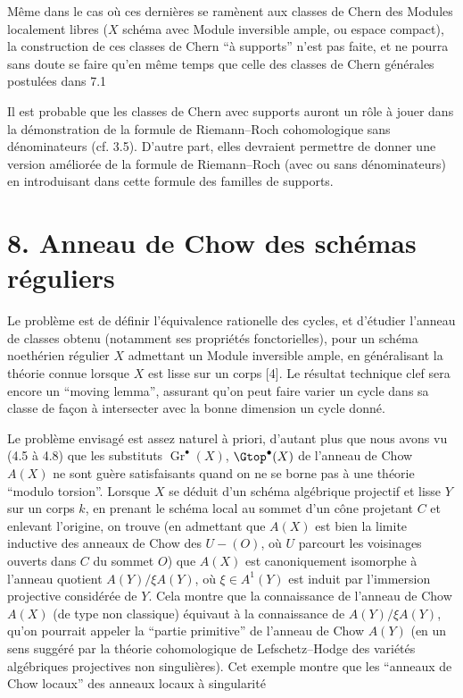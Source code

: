 
Même
dans le cas où ces dernières se ramènent aux classes de Chern des Modules localement libres ($X$ schéma avec Module inversible ample, ou espace compact), la construction de ces classes de Chern ``à supports'' n'est pas faite, et ne pourra sans doute se faire qu'en même temps que celle des classes de Chern générales postulées dans 7.1

Il est probable que les classes de Chern avec supports auront un rôle à jouer dans la démonstration de la formule de Riemann--Roch cohomologique sans dénominateurs (cf. 3.5). D'autre part, elles devraient permettre de donner une version améliorée de la formule de Riemann--Roch (avec ou sans dénominateurs) en introduisant dans cette formule des familles de supports.

\section*{8. Anneau de Chow des schémas réguliers}

Le problème est de définir l'équivalence rationelle des cycles, et d'étudier l'anneau de classes obtenu (notamment ses propriétés fonctorielles), pour un schéma noethérien régulier $X$ admettant un Module inversible ample, en généralisant la théorie connue lorsque $X$ est lisse sur un corps [4]. Le résultat technique clef sera encore un ``moving lemma'', assurant qu'on peut faire varier un cycle dans sa classe de façon à intersecter avec la bonne dimension un cycle donné.

Le problème envisagé est assez naturel à priori, d'autant plus que nous avons vu (4.5 à 4.8) que les substituts $\operatorname{Gr}^\bullet(X)$, $\Gtop^\bullet(X)$ de l'anneau de Chow $A(X)$ ne sont guère satisfaisants quand on ne se borne pas à une théorie ``modulo torsion''. Lorsque $X$ se déduit d'un schéma algébrique projectif et lisse $Y$ sur un corps $k$, en prenant le schéma local au sommet d'un cône projetant $C$ et enlevant l'origine, on trouve (en admettant que $A(X)$ est bien la limite inductive des anneaux de Chow des $U-(O)$, où $U$ parcourt les voisinages ouverts dans $C$ du sommet $O$) que $A(X)$ est canoniquement isomorphe à l'anneau quotient $A(Y)/\xi A(Y)$, où $\xi\in A^1(Y)$ est induit par l'immersion projective considérée de $Y$. Cela montre que la connaissance de l'anneau de Chow $A(X)$ (de type non classique) équivaut à la connaissance de $A(Y)/\xi A(Y)$, qu'on pourrait appeler la ``partie primitive'' de l'anneau de Chow $A(Y)$ (en un sens suggéré par la théorie cohomologique de Lefschetz--Hodge des variétés algébriques projectives non singulières). Cet exemple montre que les ``anneaux de Chow locaux'' des anneaux locaux à singularité

